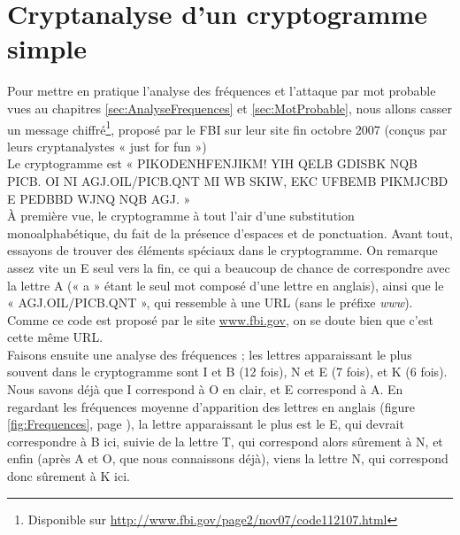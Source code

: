 \chapter{Cryptanalyse d'un cryptogramme simple\label{Apx:FBI}}
\thispagestyle{empty}
Pour mettre en pratique l'analyse des fréquences et l'attaque par
mot probable vues au chapitres \ref{sec:AnalyseFrequences} et
\ref{sec:MotProbable}, nous allons
casser un message chiffré\footnote{Disponible sur
\url{http://www.fbi.gov/page2/nov07/code112107.html}}, 
proposé par le FBI sur leur site fin
octobre 2007 (conçus par leurs cryptanalystes « just for fun »)
\\
Le cryptogramme est « PIKODENHFENJIKM! YIH QELB GDISBK NQB
PICB. OI NI AGJ.OIL/PICB.QNT MI WB SKIW, EKC UFBEMB PIKMJCBD E
PEDBBD WJNQ NQB AGJ. »
\\

À première vue, le cryptogramme à tout l'air d'une substitution
monoalphabétique, du fait de la présence d'espaces et de
ponctuation.
Avant tout, essayons de trouver des éléments spéciaux dans le
cryptogramme. On remarque assez vite un E seul vers la fin, ce qui
a beaucoup de chance de correspondre avec la lettre A (« a » étant
le seul mot composé d'une lettre en anglais), ainsi que le «
AGJ.OIL/PICB.QNT », qui ressemble à une URL (sans le préfixe
\emph{www}). Comme ce code est proposé par le site
\url{www.fbi.gov}, on se doute bien que c'est cette même URL.
\\

Faisons ensuite une analyse des fréquences ; les lettres
apparaissant le plus souvent dans le cryptogramme sont I et B (12
fois), N et E (7 fois), et K (6 fois).
Nous savons déjà que I correspond à O en clair, et E correspond à
A. En regardant les fréquences moyenne d'apparition des lettres en
anglais (figure \ref{fig:Frequences}, page
\pageref{fig:Frequences}), la lettre apparaissant le plus est le E, qui devrait
correspondre à B ici, suivie de la lettre T, qui correspond alors
sûrement à N, et enfin (après A et O, que nous connaissons déjà),
viens la lettre N, qui correspond donc sûrement à K ici.
\\

